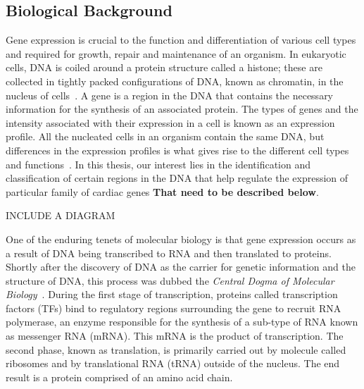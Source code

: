         \subsection{Biological Background}
        Gene expression is crucial to the function and differentiation of various cell types and required for growth, repair and maintenance of an organism.  In eukaryotic cells, DNA is coiled around a protein structure called a histone; these are collected in tightly packed configurations of DNA, known as chromatin, in the nucleus of cells~\cite{alberts2002chromosomal, kornberg1974chromatin}. A gene is a region in the DNA that contains the necessary information for the synthesis of an associated protein. The types of genes and the intensity associated with their expression in a cell is known as an expression profile. All the nucleated cells in an organism contain the same DNA, but differences in the expression profiles is what gives rise to the different cell types and functions~\cite{lockhart2000genomics}. In this thesis, our interest lies in the identification and classification of certain regions in the DNA that help regulate the expression of particular family of cardiac genes \textbf{That need to be described below}. 

        \begin{centering}
            INCLUDE A DIAGRAM
        \end{centering}
        
        One of the enduring tenets of molecular biology is that gene expression occurs as a result of DNA being transcribed to RNA and then translated to proteins. Shortly after the discovery of DNA as the carrier for genetic information and the structure of DNA, this process was dubbed the \emph{Central Dogma of Molecular Biology}~\cite{crick1958protein, macleod1944studies, watson1953structure}. During the first stage of transcription, proteins called transcription factors (TFs) bind to regulatory regions surrounding the gene to recruit RNA polymerase, an enzyme responsible for the synthesis of a sub-type of RNA known as messenger RNA (mRNA). This mRNA is the product of transcription. The second phase, known as translation, is primarily carried out by molecule called ribosomes and by translational RNA (tRNA) outside of the nucleus. The end result is a protein comprised of an amino acid chain.
        
